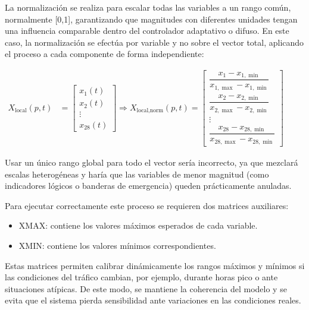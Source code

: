 \documentclass[12pt,a4paper,oneside]{report}
\newenvironment{centeredmath}
  {\begin{center}\begin{adjustbox}{max width=0.96\linewidth}\(\displaystyle}
  {\)\end{adjustbox}\end{center}}
\begin{document}
La normalización se realiza para escalar todas las variables a un rango común, normalmente {[}0,1{]}, garantizando que magnitudes con diferentes unidades tengan una influencia comparable dentro del controlador adaptativo o difuso. En este caso, la normalización se efectúa por variable y no sobre el vector total, aplicando el proceso a cada componente de forma independiente:
\begin{centeredmath}
\begin{aligned}
X_{\text{local}}(p,t)
&=
\begin{bmatrix}
x_1(t)\\
x_2(t)\\
\vdots\\
x_{28}(t)
\end{bmatrix}
\Rightarrow
X_{\text{local,norm}}(p,t)
=
\begin{bmatrix}
\dfrac{x_1-x_{1,\min}}{x_{1,\max}-x_{1,\min}}\\
\dfrac{x_2-x_{2,\min}}{x_{2,\max}-x_{2,\min}}\\
\vdots\\
\dfrac{x_{28}-x_{28,\min}}{x_{28,\max}-x_{28,\min}}
\end{bmatrix}
\end{aligned}
\end{centeredmath}

Usar un único rango global para todo el vector sería incorrecto, ya que mezclará escalas heterogéneas y haría que las variables de menor magnitud (como indicadores lógicos o banderas de emergencia) queden prácticamente anuladas.

Para ejecutar correctamente este proceso se requieren dos matrices auxiliares:

\begin{itemize}
\item
  XMAX\hspace{0pt}: contiene los valores máximos esperados de cada variable.
\item
  XMIN\hspace{0pt}: contiene los valores mínimos correspondientes.
\end{itemize}

Estas matrices permiten calibrar dinámicamente los rangos máximos y mínimos si las condiciones del tráfico cambian, por ejemplo, durante horas pico o ante situaciones atípicas. De este modo, se mantiene la coherencia del modelo y se evita que el sistema pierda sensibilidad ante variaciones en las condiciones reales.
\end{document}
